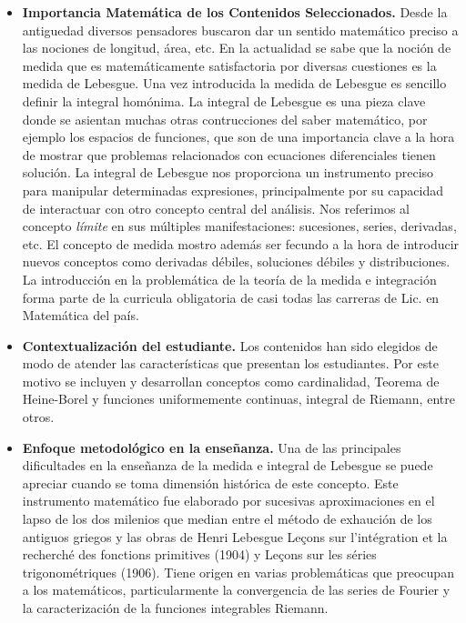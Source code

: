 \documentclass[a4paper, 12pt]{article}
\begin{document}
\begin{itemize}
 \item \textbf{Importancia Matemática de los Contenidos Seleccionados.}  Desde la antiguedad diversos pensadores buscaron dar un sentido matemático preciso  a las nociones de   longitud, área, etc. En la actualidad se sabe que la noción de medida que es matemáticamente satisfactoria por diversas cuestiones es la medida de Lebesgue. Una vez introducida la medida de Lebesgue es sencillo definir la integral homónima.   La integral de Lebesgue es una pieza clave donde se asientan  muchas otras contrucciones del saber matemático, por ejemplo los espacios de funciones, que son de una importancia clave a la hora de mostrar que problemas  relacionados con ecuaciones diferenciales tienen solución. La integral de Lebesgue nos proporciona  un instrumento preciso para manipular determinadas expresiones, principalmente por su capacidad de interactuar con otro  concepto central del análisis. Nos referimos al concepto \emph{límite} en sus múltiples manifestaciones: sucesiones, series, derivadas, etc. El concepto de medida mostro además ser fecundo a la hora de introducir nuevos conceptos como derivadas débiles, soluciones débiles y distribuciones. 
 La introducción en la problemática de  la teoría de la medida e integración forma parte de la curricula obligatoria de casi todas las carreras de Lic. en Matemática del país.
 
\item \textbf{Contextualización del estudiante.} Los contenidos han sido elegidos de modo de atender las características que presentan los estudiantes. Por este motivo se  incluyen y desarrollan conceptos como cardinalidad, Teorema de Heine-Borel y funciones uniformemente continuas, integral de Riemann, entre otros. 



\item \textbf{Enfoque metodológico en la enseñanza.} Una de las principales dificultades en la enseñanza  de la medida e integral de Lebesgue se puede apreciar cuando se toma dimensión histórica de este concepto.  Este instrumento matemático fue elaborado por sucesivas aproximaciones en el lapso de los dos milenios que median entre el método de exhaución de los antiguos griegos y las obras de Henri Lebesgue Leçons sur l'intégration et la recherché des fonctions primitives (1904) y Leçons sur les séries trigonométriques (1906). Tiene origen en varias problemáticas que preocupan a los matemáticos, particularmente  la convergencia de las series de Fourier y la caracterización de la funciones integrables Riemann. 


\end{itemize}
\end{document}
